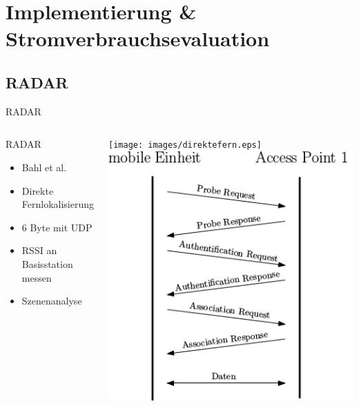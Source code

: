 \documentclass[18pt]{beamer}
\begin{document}
\section{Implementierung \& Stromverbrauchsevaluation}
\subsection{RADAR}
\begin{frame}{RADAR}
	\begin{columns}
			\begin{block}{RADAR}
				\begin{itemize}
					\item Bahl et al. \cite{bahl2000radar}
					\item Direkte Fernlokalisierung
					\item 6 Byte mit UDP
					\item RSSI an Basisstation messen
					\item Szenenanalyse
				\end{itemize}
			\end{block}
			\centering
			\texttt{[image: images/direktefern.eps]}
			\includegraphics[width=\textwidth]{images/reupper.png}
	\end{columns}
\end{frame}
\end{document}
